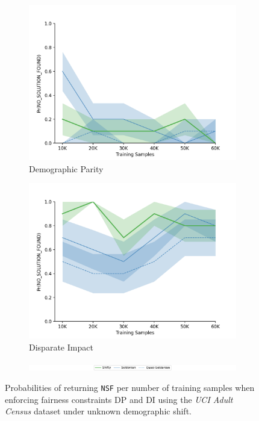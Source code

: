 \begin{figure}[ht]
    \begin{subfigure}{0.5\linewidth}
      \centering
      \includegraphics[width=0.8\linewidth]{figures/iclr_antag_demographic_shift_adult_rl/iclr_adult_antag_ds_rl_dp.png}
      \caption{Demographic Parity}
      \label{fig:adult_unk_dp}
    \end{subfigure}
    \begin{subfigure}{0.5\linewidth}
      \centering
      \includegraphics[width=0.8\linewidth]{figures/iclr_antag_demographic_shift_adult_rl/iclr_adult_antag_ds_rl_di.png}
      \caption{Disparate Impact}
      \label{fig:adult_unk_di}
    \end{subfigure}
    \begin{subfigure}{\textwidth}
        \includegraphics[width=\linewidth]{figures/iclr_legend.png}
    \end{subfigure}
    \caption{Probabilities of returning \texttt{NSF} per number of training samples when enforcing fairness constraints DP and DI using the \textit{UCI Adult Census} dataset under unknown demographic shift. }
    \label{fig:adult_unknown_shift}
\end{figure}


